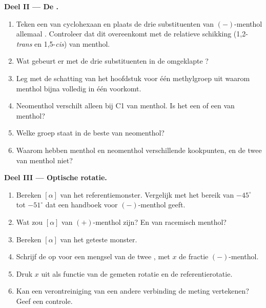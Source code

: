 \begin{problem}
\medskip
\noindent\textbf{Deel II --- De .}
\begin{enumerate}[resume]
  \item Teken een  van cyclohexaan en plaats de drie substituenten
        van $(-)$-menthol allemaal . Controleer dat dit
        overeenkomt met de relatieve schikking (1,2-\textit{trans} en
        1,5-\textit{cis}) van menthol.
  \item Wat gebeurt er met de drie substituenten in de omgeklapte ?
  \item Leg met de schatting van het hoofdstuk voor één 
        methylgroep uit waarom menthol bijna volledig in één 
        voorkomt.
  \item Neomenthol verschilt alleen bij C1 van menthol. Is het een
         of een  van menthol?
  \item Welke groep staat  in de beste  van neomenthol?
  \item Waarom hebben menthol en neomenthol verschillende kookpunten, en
        de twee  van menthol niet?
\end{enumerate}

\medskip
\noindent\textbf{Deel III --- Optische rotatie.}
\begin{enumerate}[resume]
  \item Bereken $[\alpha]$ van het referentiemonster. Vergelijk met het
        bereik van $-45^\circ$ tot $-51^\circ$ dat een handboek voor
        $(-)$-menthol geeft.
  \item Wat zou $[\alpha]$ van $(+)$-menthol zijn? En van racemisch
        menthol?
  \item Bereken $[\alpha]$ van het geteste monster.
  \item Schrijf de  op voor een mengsel van de twee
        , met $x$ de fractie $(-)$-menthol.
  \item Druk $x$ uit als functie van de gemeten rotatie en de
        referentierotatie.
  \item Kan een  verontreiniging van een andere verbinding de
        meting vertekenen? Geef een controle.
\end{enumerate}


\end{problem}
